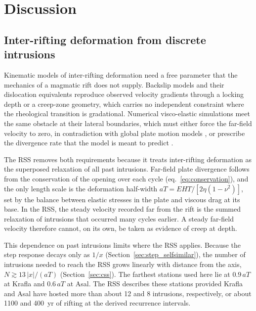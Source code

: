 \documentclass[extra]{gji}
\begin{document}
\section{Discussion}
\label{sec:discussion}

\subsection{Inter-rifting deformation from discrete intrusions}
\label{sec:disc_bcs}

Kinematic models of inter-rifting deformation need a free parameter that
the mechanics of a magmatic rift does not supply.  Backslip models
\citep{savage1978asthenosphere} and their dislocation equivalents
\citep{lafemina2005geodetic,konca2018slip} reproduce observed velocity
gradients through a locking depth or a creep-zone geometry, which carries
no independent constraint where the rheological transition is gradational.
Numerical visco-elastic simulations meet the same obstacle at their lateral
boundaries, which must either force the far-field velocity to zero, in
contradiction with global plate motion models \citep{altamimi2016itrf2014},
or prescribe the divergence rate that the model is meant to predict
\citep{hofton1995horizontal,hofton1996post}.

The RSS removes both requirements because it treats inter-rifting
deformation as the superposed relaxation of all past intrusions.
Far-field plate divergence follows from the conservation of the opening
over each cycle (eq.~\ref{eq:conservation}), and the only length
scale is the deformation half-width $aT = EHT/[2\eta(1-\nu^2)]$, set by the
balance between elastic stresses in the plate and viscous drag at its
base.  In the RSS, the steady velocity recorded far from the rift is the
summed relaxation of intrusions that occurred many cycles earlier.  A
steady far-field velocity therefore cannot, on its own, be taken as
evidence of creep at depth.

This dependence on past intrusions limits where the RSS applies.  Because
the step response decays only as $1/x$ (Section~\ref{sec:step_selfsimilar}),
the number of intrusions needed to reach the RSS grows linearly with
distance from the axis, $N \gtrsim 13\,|x|/(aT)$ (Section~\ref{sec:css}).
The farthest stations used here lie at $0.9\,aT$ at Krafla and $0.6\,aT$
at Asal. The RSS describes these stations provided Krafla and Asal have hosted
more than about 12 and 8 intrusions, respectively, or about 1100 and
400~yr of rifting at the derived recurrence intervals.
\end{document}

